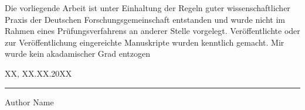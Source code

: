 \documentclass[12pt, openany]{book}
\def\MYAUTHOR{Author Name}
\begin{document}
\noindent{}Die vorliegende Arbeit ist unter Einhaltung der Regeln guter wissenschaftlicher Praxis der Deutschen Forschungsgemeinschaft entstanden und wurde nicht im Rahmen eines Prüfungsverfahrens an anderer Stelle vorgelegt.
Veröffentlichte oder zur Veröffentlichung eingereichte Manuskripte wurden kenntlich gemacht.
Mir wurde kein akadamischer Grad entzogen\\\vspace{.07\paperheight}

\noindent{}XX, XX.XX.20XX\hfill{}\rule{.25\textwidth}{0.4pt}

\hfill{}\MYAUTHOR\hspace*{.04\textwidth}\\

\newpage
\thispagestyle{empty}
\ \\
\end{document}
